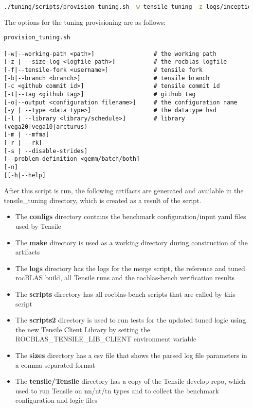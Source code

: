 \documentclass[]{article}
\begin{document}
\begin{lstlisting}[language=bash,breaklines=true]
./tuning/scripts/provision_tuning.sh -w tensile_tuning -z logs/inception-rocblas-configs_unique.log -o tf_inception.yaml -y sgemm -l vega20 
\end{lstlisting}

\noindent
The options for the tuning provisioning are as follows:

\begin{verbatim}
provision_tuning.sh 

[-w|--working-path <path>]                 # the working path
[-z | --size-log <logfile path>]           # the rocblas logfile 
[-f|--tensile-fork <username>]             # tensile fork
[-b|--branch <branch>]                     # tensile branch
[-c <github commit id>]                    # tensile commit id
[-t|--tag <github tag>]                    # github tag 
[-o|--output <configuration filename>]     # the configuration name
[-y | --type <data type>]                  # the datatype hsd
[-l | --library <library/schedule>]        # library (vega20|vega10|arcturus)
[-m | --mfma] 
[-r | --rk] 
[-s | --disable-strides] 
[--problem-definition <gemm/batch/both] 
[-n] 
[[-h|--help]

\end{verbatim}

After this script is run, the following artifacts are generated and available in the tensile\_tuning directory, which is created as a result of the script.

\begin{itemize}
	

 \item The \textbf{configs} directory contains the benchmark configuration/input yaml files used by Tensile
 
 \item The \textbf{make} directory is used as a working directory during construction of the artifacts

 \item The \textbf{logs} directory has the logs for the merge script, the reference and tuned rocBLAS build, all Tensile runs and the rocblas-bench verification results
 
 \item The \textbf{scripts} directory has all rocblas-bench scripts that are called by this script
 
 \item The \textbf{scripts2} directory is used to run tests for the updated tuned logic using the new Tensile Client Library by setting the \\ROCBLAS\_TENSILE\_LIB\_CLIENT environment variable
 
 \item The \textbf{sizes} directory has a csv file that shows the parsed log file parameters in a comma-separated format
 
 \item The \textbf{tensile/Tensile} directory has a copy of the Tensile develop repo, which used to run Tensile on nn/nt/tn types and to collect the benchmark configuration and logic files
	
\end{itemize}
\end{document}

